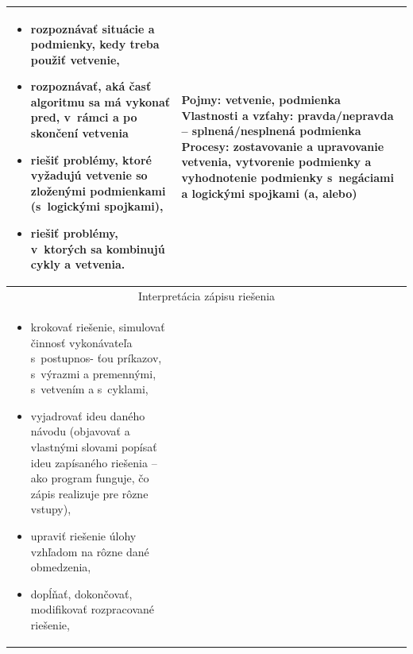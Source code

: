 \documentclass[FP,DP]{tulthesis}
\begin{document}
{{{{{{\begin{table}[t]
\begin{tabular}{|l|l|}
\begin{minipage}[t]{0.45\textwidth}
\begin{itemize}[leftmargin=*,nosep]
  	\item rozpoznávať situácie a podmienky, kedy treba použiť vetvenie,
	\item rozpoznávať, aká časť algoritmu sa má vykonať pred, v~rámci
a po skončení vetvenia
\item riešiť problémy, ktoré vyžadujú vetvenie so zloženými podmienkami
(s~logickými spojkami),
\item riešiť problémy, v~ktorých sa kombinujú cykly a vetvenia.
\end{itemize}
  \end{minipage} &
  \begin{minipage}[t]{0.45\textwidth}
Pojmy: vetvenie, podmienka
Vlastnosti a vzťahy: pravda/nepravda – splnená/nesplnená podmienka
Procesy: zostavovanie a upravovanie vetvenia, vytvorenie podmienky
a vyhodnotenie podmienky s~negáciami a logickými spojkami (a, alebo)
  \end{minipage}\\\hline
\multicolumn{2}{|c|}{Interpretácia zápisu riešenia}\\\hline
\begin{minipage}[t]{0.45\textwidth}
\begin{itemize}[leftmargin=*,nosep]
  	\item krokovať riešenie, simulovať činnosť vykonávateľa s~postupnos-
ťou príkazov, s~výrazmi a premennými, s~vetvením a s~cyklami,
	\item vyjadrovať ideu daného návodu (objavovať a vlastnými slovami
popísať ideu zapísaného riešenia – ako program funguje, čo zápis
realizuje pre rôzne vstupy),
\item upraviť riešenie úlohy vzhľadom na rôzne dané obmedzenia,
\item dopĺňať, dokončovať, modifikovať rozpracované riešenie,


\end{itemize}
\end{minipage}
\end{tabular}
\end{table}}}}}}}
\end{document}
